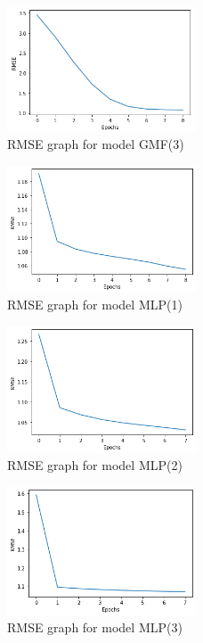 \documentclass[final]{cvpr}
\begin{document}
\begin{figure}
	\includegraphics[width=0.5\textwidth]{screenshot20210415234450.png}
	\caption{RMSE graph for model GMF(3)}
\end{figure}

\begin{figure}
	\includegraphics[width=0.5\textwidth]{mlp_1.png}
	\caption{RMSE graph for model MLP(1)}
\end{figure}

\begin{figure}
	\includegraphics[width=0.5\textwidth]{mlp_2.png}
	\caption{RMSE graph for model MLP(2)}
\end{figure}

\begin{figure}
	\includegraphics[width=0.5\textwidth]{mlp_3.png}
	\caption{RMSE graph for model MLP(3)}
\end{figure}
\end{document}

